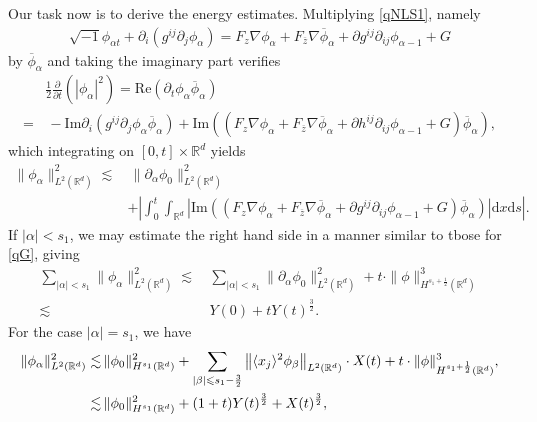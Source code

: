 \documentclass[10pt,twoside,a4paper]{article}
\numberwithin{equation}{section}\allowdisplaybreaks
\def\leq{\leqslant}
\begin{document}
Our task now is to  derive the energy  estimates.	
Multiplying \eqref{qNLS1}, namely 
\begin{align*}
	\sqrt{-1}\phi_{\alpha t}+\partial_i\left( g^{ij} \partial_j \phi_{\alpha }\right)=F_z\nabla \phi_\alpha+F_{\overline{z}}\nabla \overline{\phi}_\alpha+\partial g^{ij}\partial_{ij } \phi_{\alpha -1}+G
\end{align*}
by
$ \overline{\phi}_{\alpha } $ and taking the imaginary part verifies
\begin{align*}  
	&\frac 12\frac{\partial}{\partial  t}\left(  \left| \phi_{\alpha } \right|^2 \right)=\mathrm{Re}\left(   \partial_t \phi_{\alpha }  \overline{\phi}_{\alpha } \right)	\nonumber\\
	=&\,-  \mathrm{Im}\partial_i\left(  g^{ij} \partial_j \phi_{\alpha } \overline{\phi}_{\alpha }\right)+\mathrm{Im} \left(  \left(F_z\nabla \phi_{\alpha}+F_{\overline{z}}\nabla \overline{\phi}_\alpha+\partial h^{ij}\partial_{ij } \phi_{\alpha -1}+G\right)\overline{\phi}_{\alpha }\right),
\end{align*}
which integrating on $  [0,t]\times\mathbb{R}^d  $  yields
 \begin{align*}  
 	  \| \phi_\alpha\|_{L^{ 2 }(\mathbb{R}^d)}^2\lesssim &\, 	 \| \partial_\alpha\phi_0\|_{L^{ 2}(\mathbb{R}^d)}^2\nonumber\\
 	 &+ \left|\int_0^t\int_{\mathbb{R}^d} \left| \mathrm{Im} \left(  \left(F_z\nabla \phi_\alpha+F_{\overline{z}}\nabla \overline{\phi}_\alpha+\partial g^{ij}\partial_{ij } \phi_{\alpha -1}+G\right)\overline{\phi}_{\alpha }\right)\right| \mathrm{d} x\mathrm{d} s \right|.
 \end{align*}
If $ |\alpha|<s_1 $,  we may estimate the right hand side in a manner similar to tbose for \eqref{qG}, giving
\begin{align}\label{qener1}
 \sum_{|\alpha|< s_1} \| \phi_\alpha\|_{L^{ 2 }(\mathbb{R}^d)}^2 \lesssim&\, \sum_{|\alpha|< s_1} \| \partial_\alpha\phi_0\|_{L^{ 2}(\mathbb{R}^d)}^2+t\cdot\|\phi\|^3_{H^{s_1+\frac 12}(\mathbb{R}^{d})}\\
 \lesssim &\, Y(0) +t Y(t)^{\frac 32}. \nonumber
\end{align}
For the case  $ |\alpha|=s_1 $, we have
\begin{align} \label{qener2}
 \| \phi_\alpha\|_{L^{ 2 }(\mathbb{R}^d)}^2	\lesssim &\,	\| \phi_0\|_{H^{s_1 }(\mathbb{R}^d)}^2+\sum_{|\beta| \leq s_1-\frac 32}\left\| \langle x_j\rangle^2 \phi_{\beta}\right\|_{L^2(\mathbb{R}^d)} \cdot X(t)+t\cdot\|\phi\|^3_{H^{s_1+\frac 12}(\mathbb{R}^{d})}, \\
	\vspace{-25pt}
	\lesssim &\, \| \phi_0\|_{H^{s_1 }(\mathbb{R}^d)}^2+  (1+t) Y(t)^{\frac 32} +  X(t)^{\frac 32},\nonumber
\end{align}
\end{document}
